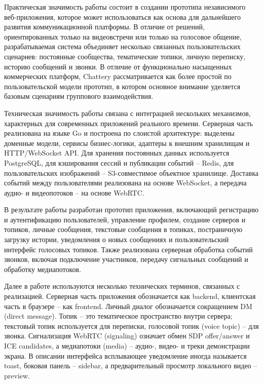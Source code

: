 \documentclass[a4paper,12pt]{extarticle}
\begin{document}
Практическая значимость работы состоит в создании прототипа независимого веб-приложения, которое может использоваться как основа для дальнейшего развития коммуникационной платформы. В отличие от решений, ориентированных только на видеовстречи или только на голосовое общение, разрабатываемая система объединяет несколько связанных пользовательских сценариев: постоянные сообщества, тематические топики, личную переписку, историю сообщений и звонки. В отличие от функционально насыщенных коммерческих платформ, Chattery рассматривается как более простой по пользовательской модели прототип, в котором основное внимание уделяется базовым сценариям группового взаимодействия.

Техническая значимость работы связана с интеграцией нескольких механизмов, характерных для современных приложений реального времени. Серверная часть реализована на языке Go и построена по слоистой архитектуре: выделены доменные модели, сервисы бизнес-логики, адаптеры к внешним хранилищам и HTTP/WebSocket API. Для хранения постоянных данных используется PostgreSQL, для кэширования сессий и публикации событий -- Redis, для пользовательских изображений -- S3-совместимое объектное хранилище. Доставка событий между пользователями реализована на основе WebSocket, а передача аудио- и видеопотоков -- на основе WebRTC.

В результате работы разработан прототип приложения, включающий регистрацию и аутентификацию пользователей, управление профилем, создание серверов и топиков, личные сообщения, текстовые сообщения в топиках, постраничную загрузку истории, уведомления о новых сообщениях и пользовательский интерфейс голосовых топиков. Также реализована серверная обработка событий звонков, включая подключение участников, передачу сигнальных сообщений и обработку медиапотоков.

Далее в работе используются несколько технических терминов, связанных с реализацией. Серверная часть приложения обозначается как backend, клиентская часть в браузере -- как frontend. Личный диалог обозначается сокращением DM (direct message). Топик -- это тематическое пространство внутри сервера; текстовый топик используется для переписки, голосовой топик (voice topic) -- для звонка. Сигнализация WebRTC (signaling) означает обмен SDP offer/answer и ICE candidates, а медиапотоки (media) -- аудио-, видео- и треки демонстрации экрана. В описании интерфейса всплывающее уведомление иногда называется toast, боковая панель -- sidebar, а предварительный просмотр локального видео -- preview.
\end{document}
